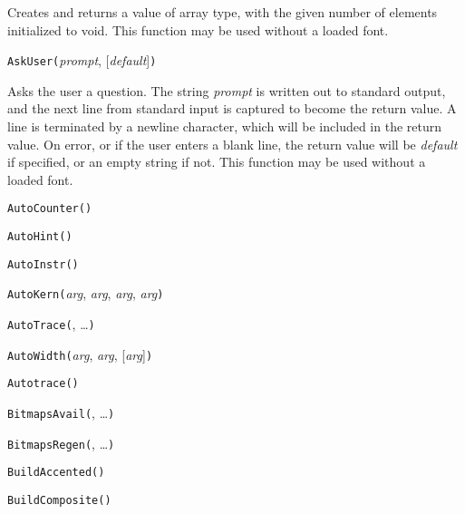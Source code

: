 Creates and returns a value of array type, with the given number of
elements initialized to void.
This function may be used without a loaded font.


\noindent\texttt{AskUser(}\textit{prompt}, [\textit{default}]\texttt{)}

Asks the user a question.  The string \textit{prompt} is written out to
standard output, and the next line from standard input is captured to become
the return value.  A line is terminated by a newline character, which will
be included in the return value.  On error, or if the user enters a blank
line, the return value will be \textit{default} if specified, or an empty
string if not.
This function may be used without a loaded font.


\noindent\texttt{AutoCounter(}\texttt{)}


\noindent\texttt{AutoHint(}\texttt{)}


\noindent\texttt{AutoInstr(}\texttt{)}


\noindent\texttt{AutoKern(}\textit{arg}, \textit{arg}, \textit{arg}, \textit{arg}\texttt{)}


\noindent\texttt{AutoTrace(}, \ldots\texttt{)}


\noindent\texttt{AutoWidth(}\textit{arg}, \textit{arg}, [\textit{arg}]\texttt{)}


\noindent\texttt{Autotrace(}\texttt{)}


\noindent\texttt{BitmapsAvail(}, \ldots\texttt{)}


\noindent\texttt{BitmapsRegen(}, \ldots\texttt{)}


\noindent\texttt{BuildAccented(}\texttt{)}


\noindent\texttt{BuildComposite(}\texttt{)}


